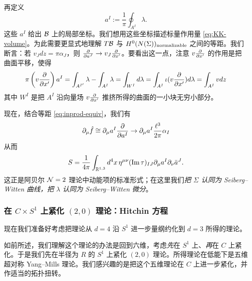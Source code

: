 再定义
\begin{equation}
a^I := \frac{1}{\pi} \oint_{A^I} \lambda.
\end{equation}
这些 $a^I$ 给出 $\mathcal{B}$ 上的局部坐标。我们想用这些坐标描述标量作用量 \eqref{eq:KK-volume}。为此需要更显式地理解 $T\mathcal{B}$ 与 $H^0(N(\Sigma))_{\rm normalizable}$ 之间的等距。我们断言：若 $v_J dz = \pi \alpha_J$，则 $\frac{\partial}{\partial a^J} \to v_J \frac{\partial}{\partial x'}$。要看出这一点，注意 $v \frac{\partial}{\partial x'}$ 的作用是把曲面平移，使得
\begin{equation}
\pi \left( v \frac{\partial}{\partial x'}\right) a^I = \int_{A^{I'}}  \lambda
-\int_{A^{I}}   \lambda= \int_{W^I}   d\lambda = \int_{A^I} \iota( v
\frac{\partial}{\partial x'})  d \lambda =   \int_{A^I} v dz
\end{equation}
其中 $W^I$ 是把 $A^I$ 沿向量场 $v \frac{\partial}{\partial x'}$ 推挤所得的曲面的一小块无穷小部分。

现在，结合等距 \eqref{eq:inprod-equiv}，我们有
\begin{equation}
\partial_\mu \hat f \cong \partial_\mu a^I \frac{\partial}{\partial a^I} \to \partial_\mu a^I
\frac{\ell^3}{2\pi} \alpha_I
\end{equation}
从而
\begin{equation} S = \frac{1}{4\pi} \int_{\mathbb{R}^{1,3}}
d^4x \, \eta^{\mu\nu} (\operatorname{Im} \tau)_{IJ} \partial_\mu a^I \partial_\nu
\bar{a}^J.
\end{equation}
这正是阿贝尔 $\mathcal{N}=2$ 理论中动能项的标准形式；在这里我们\emph{把 $\Sigma$ 认同为 Seiberg–Witten 曲线，把 $\lambda$ 认同为 Seiberg–Witten 微分}。

\subsubsection{在 $C \times S^1$ 上紧化 $(2,0)$ 理论：Hitchin 方程} \label{sec:hiteq}

现在我们准备好考虑把理论从 $d=4$ 沿 $S^1$ 进一步量纲约化到 $d=3$ 所得的理论。

如前所述，我们理解这个理论的办法是回到六维，考虑\emph{先}在 $S^1$ 上、\emph{再}在 $C$ 上紧化。于是我们先在半径为 $R$ 的 $S^1$ 上紧化 $(2,0)$ 理论。所得理论在低能下是五维超对称 Yang–Mills 理论。我们感兴趣的是把这个五维理论在 $C$ 上进一步紧化，并作适当的拓扑扭转。

